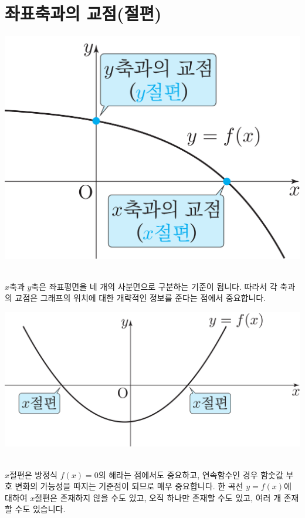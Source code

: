 \section{좌표축과의 교점(절편)}
\begin{center} \includegraphics[scale=\pgfkeysvalueof{picsize}]{DBs/pic/zery_11.pdf}\
	\end{center}$x$축과 $y$축은 좌표평면을 네 개의 사분면으로 구분하는 기준이 됩니다. 따라서 각 축과의 교점은 그래프의 위치에 대한 개략적인 정보를 준다는 점에서 중요합니다.
\clearpage\begin{center} \includegraphics[scale=\pgfkeysvalueof{picsize}]{DBs/pic/zery_12.pdf}\
	\end{center}$x$절편은 방정식 $f\left( x \right) = 0$의 해라는 점에서도 중요하고, 연속함수인 경우 함숫값 부호 변화의 가능성을 따지는 기준점이 되므로 매우 중요합니다. 한 곡선 $y=f\left( x \right) $에 대하여 $x$절편은 존재하지 않을 수도 있고, 오직 하나만 존재할 수도 있고, 여러 개 존재할 수도 있습니다.
